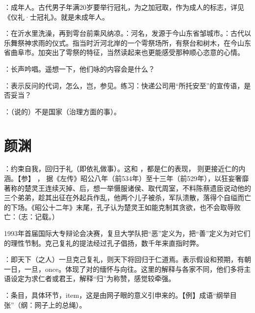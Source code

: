 {\item {}：成年人。古代男子年满20岁要举行冠礼，为之加冠取，作为成人的标志，详见《仪礼·士冠礼》。就是未成年人。
\item {}：在沂水里洗澡，再到雩台前乘风纳凉。：河名，发源于今山东省邹城市。：古代以乐舞祭神求雨的仪式。指当时沂河北岸的一个雩祭场所，有祭台和树木，在今山东省曲阜市。加突出了雩祭的特征，当然读起来也更能感受那种顺心恣意的心情。%
\item {}：长声吟唱。遥想一下，他们咏的内容会是什么？
\item {}：表示反问的代词，怎么，岂，参见。练习：快递公司用“所托安至”的宣传语，是否妥当？
\item {}：（说的）不是国家（治理方面的事）。
}
{}



\chapter{颜渊}

{
\item {}：约束自我，回归于礼（即依礼做事）。这和  ，都是仁的表现， 则更接近仁的内涵。【参】 ， 据《左传》昭公八年（前534年）至十三年（前529年），以狂妄奢靡著称的楚灵王连续灭掉、后，想一举慑服诸侯、取代周室，不料陈蔡遗臣说动他的三个弟弟，趁其出征在外起兵作乱，他两个儿子被杀，军队溃散，落得个自缢而亡的下场。《昭公十二年》末尾，孔子认为楚灵王如能克制其贪欲，也不会取辱败亡：（志：记载。）

1993年首届国际大专辩论会决赛，复旦大学队把“恶”定义为，把“善”定义为对它们的理性节制。克己复礼的提法经过孔子倡扬，数千年来直指时弊。
\item {}：即天下（之人）一旦克己复礼，则天下将回归于仁道焉。表示假设和预期，有朝一日，一旦，once。体现了对的缅怀与向往。这里的解释与各家不同，他们多将主语设定为求仁者或君王，解释“归”为称赞，感觉较牵强。
\item {}：条目，具体环节，item，这是由网子眼的意义引申来的。【例】成语“纲举目张”（纲：网子上的总绳）。
}
{}  %


